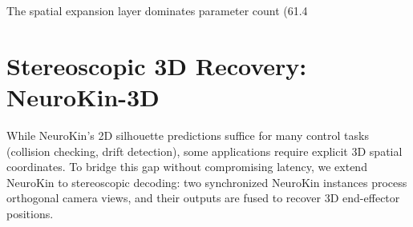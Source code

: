 \documentclass[12pt,a4paper,oneside]{report}
\begin{document}
\begin{table}[H]
\centering
\caption{NeuroKin parameter distribution by component.}
\label{tab:neurokin_params_ch4}
\end{table}

The spatial expansion layer dominates parameter count (61.4%

\section{Stereoscopic 3D Recovery: NeuroKin-3D}

While NeuroKin's 2D silhouette predictions suffice for many control tasks (collision checking, drift detection), some applications require explicit 3D spatial coordinates. To bridge this gap without compromising latency, we extend NeuroKin to stereoscopic decoding: two synchronized NeuroKin instances process orthogonal camera views, and their outputs are fused to recover 3D end-effector positions.
\end{document}
